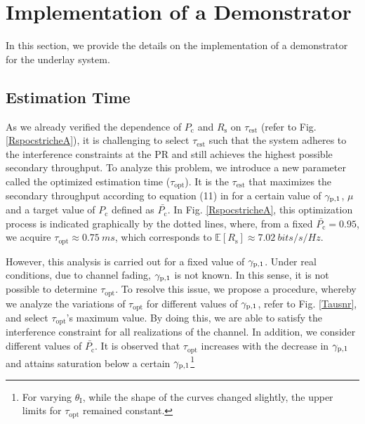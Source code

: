 \section{Implementation of a Demonstrator}
\label{demo}

In this section, we provide the details on the implementation of a demonstrator for the underlay system. 

\subsection{Estimation Time}
\label{esttime}
As we already verified the dependence of $P_\textrm{c}$ and $R_\textrm{s}$ on $\tau_\textrm{est}$ (refer to Fig. \ref{RspocstricheA}), it is challenging to select $\tau_\textrm{est}$ such that the system adheres to the interference constraints at the PR and still achieves the highest possible secondary throughput. To analyze this problem, we introduce a new parameter called the optimized estimation time ($\tau_\textrm{opt}$). It is the $\tau_\textrm{est}$ that maximizes the secondary throughput according to equation (11) in \cite{Kaushik15} for a certain value of ${\gamma}_{\text{p,1}}$, $\mu$ and a target value of $P_\textrm{c}$ defined as $\bar{P_\textrm{c}}$. In Fig. \ref{RspocstricheA}, this optimization process is indicated graphically by the dotted lines, where, from a fixed $\bar{P_\textrm{c}} = 0.95$, we acquire $\tau_\textrm{opt} \approx \SI{0.75}{ms}$, which corresponds to $\mathbb{E}\left[R_\textrm{s}\right] \approx \SI{7.02}{bits/s/Hz}$.

However, this analysis is carried out for a fixed value of ${\gamma}_{\text{p,1}}$. Under real conditions, due to channel fading, ${\gamma}_{\text{p,1}}$ is not known. In this sense, it is not possible to determine $\tau_\textrm{opt}$. To resolve this issue, we propose a procedure, whereby we analyze the variations of $\tau_\textrm{opt}$ for different values of ${\gamma}_{\text{p,1}}$, refer to Fig. \ref{Tausnr}, and select $\tau_\textrm{opt}$'s maximum value. By doing this, we are able to satisfy the interference constraint for all realizations of the channel. In addition, we consider different values of $\bar{P_\textrm{c}}$. It is observed that $\tau_\textrm{opt}$ increases with the decrease in ${\gamma}_{\text{p,1}}$ and attains saturation below a certain ${\gamma}_{\text{p,1}}$\footnote{For varying $\theta_\textrm{I}$, while the shape of the curves changed slightly, the upper limits for $\tau_\textrm{opt}$ remained constant.} 

